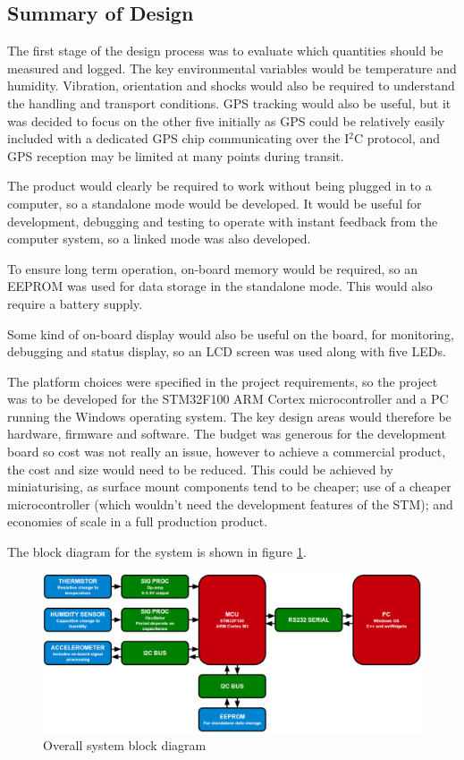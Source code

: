 \documentclass[a4paper,10pt]{article}  %
\begin{document}
\subsection{Summary of Design}
\label{sec:summary-design}

The first stage of the design process was to evaluate which quantities
should be measured and logged. The key environmental variables would
be temperature and humidity. Vibration, orientation and shocks would
also be required to understand the handling and transport
conditions. GPS tracking would also be useful, but it was decided to
focus on the other five initially as GPS could be relatively easily
included with a dedicated GPS chip communicating over the I$^2$C
protocol, and GPS reception may be limited at many points during
transit.

The product would clearly be required to work without being plugged in
to a computer, so a standalone mode would be developed. It would be
useful for development, debugging and testing to operate with instant
feedback from the computer system, so a linked mode was also
developed.

To ensure long term operation, on-board memory would be required, so an
EEPROM was used for data storage in the standalone mode. This would
also require a battery supply.

Some kind of on-board display would also be useful on the board, for
monitoring, debugging and status display, so an LCD screen was used
along with five LEDs.

The platform choices were specified in the project requirements, so
the project was to be developed for the STM32F100 ARM Cortex
microcontroller and a PC running the Windows operating system. The key
design areas would therefore be hardware, firmware and software. The
budget was generous for the development board so cost was not really
an issue, however to achieve a commercial product, the cost and size
would need to be reduced. This could be achieved by miniaturising, as
surface mount components tend to be cheaper; use of a cheaper
microcontroller (which wouldn't need the development features of the
STM); and economies of scale in a full production product.

The block diagram for the system is shown in figure
\ref{fig:sysblkdgrm}.
\begin{figure}[htb]
  \begin{center}
    \includegraphics[width=1.0\textwidth]{System_diagram.png}
  \end{center}
  \caption{Overall system block diagram}
  \label{fig:sysblkdgrm}
\end{figure}
\end{document}
